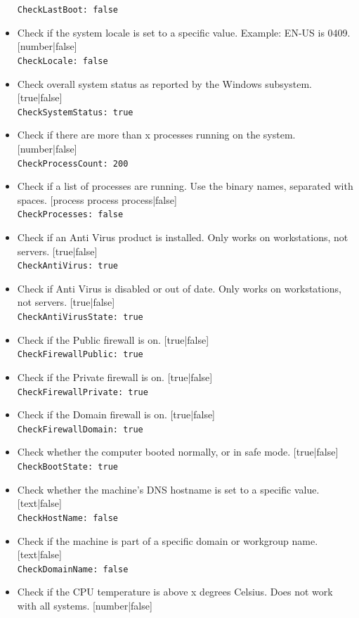 \documentclass[11pt]{article}
\begin{document}
\begin{itemize}
\texttt{CheckLastBoot: false}
\item Check if the system locale is set to a specific value. Example: EN-US is 0409. [number|false]\\
\texttt{CheckLocale: false}
\item Check overall system status as reported by the Windows subsystem. [true|false]\\
\texttt{CheckSystemStatus: true}
\item Check if there are more than x processes running on the system. [number|false]\\
\texttt{CheckProcessCount: 200}
\item Check if a list of processes are running. Use the binary names, separated with spaces. [process process process|false]\\
\texttt{CheckProcesses: false}
\item Check if an Anti Virus product is installed. Only works on workstations, not servers. [true|false]\\
\texttt{CheckAntiVirus: true}
\item Check if Anti Virus is disabled or out of date. Only works on workstations, not servers. [true|false]\\
\texttt{CheckAntiVirusState: true}
\item Check if the Public firewall is on. [true|false]\\
\texttt{CheckFirewallPublic: true}
\item Check if the Private firewall is on. [true|false]\\
\texttt{CheckFirewallPrivate: true}
\item Check if the Domain firewall is on. [true|false]\\
\texttt{CheckFirewallDomain: true}
\item Check whether the computer booted normally, or in safe mode. [true|false]\\
\texttt{CheckBootState: true}
\item Check whether the machine's DNS hostname is set to a specific value. [text|false]\\
\texttt{CheckHostName: false}
\item Check if the machine is part of a specific domain or workgroup name. [text|false]\\
\texttt{CheckDomainName: false}
\item Check if the CPU temperature is above x degrees Celsius. Does not work with all systems. [number|false]\\

\end{itemize}
\end{document}
